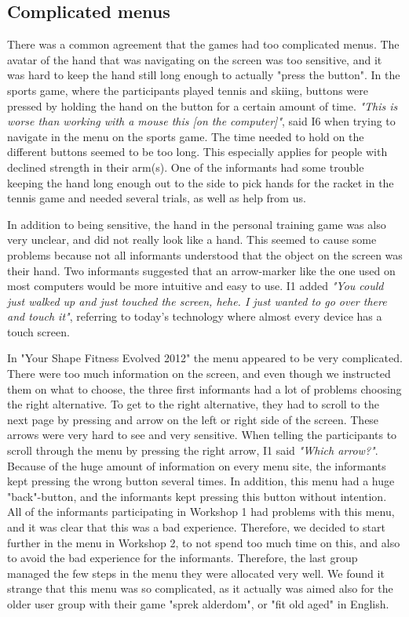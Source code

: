 \subsection{Complicated menus}
There was a common agreement that the games had too complicated menus.  The avatar of the hand that was navigating on the screen was too sensitive, and it was hard to keep the hand still long enough to actually "press the button". In the sports game, where the participants played tennis and skiing, buttons were pressed by holding the hand on the button for a certain amount of time. \emph{"This is worse than working with a mouse this [on the computer]"}, said I6 when trying to navigate in the menu on the sports game. The time needed to hold on the different buttons seemed to be too long. This especially applies for people with declined strength in their arm(s). One of the informants had some trouble keeping the hand long enough out to the side to pick hands for the racket in the tennis game and needed several trials, as well as help from us.

In addition to being sensitive, the hand in the personal training game was also very unclear, and did not really look like a hand. This seemed to cause some problems because not all informants understood that the object on the screen was their hand. Two informants suggested that an arrow-marker like the one used on most computers would be more intuitive and easy to use. I1 added \emph{"You could just walked up and just touched the screen, hehe. I just wanted to go over there and touch it"}, referring to today's technology where almost every device has a touch screen. 

In "Your Shape Fitness Evolved 2012" the menu appeared to be very complicated. There were too much information on the screen, and even though we instructed them on what to choose, the three first informants had a lot of problems choosing the right alternative. To get to the right alternative, they had to scroll to the next page by pressing and arrow on the left or right side of the screen. These arrows were very hard to see and very sensitive. When telling the participants to scroll through the menu by pressing the right arrow, I1 said \emph{"Which arrow?"}.  Because of the huge amount of information on every menu site, the informants kept pressing the wrong button several times. In addition, this menu had a huge "back"-button, and the informants kept pressing this button without intention. All of the informants participating in Workshop 1 had problems with this menu, and it was clear that this was a bad experience.  Therefore, we decided to start further in the menu in Workshop 2, to not spend too much time on this, and also to avoid the bad experience for the informants. Therefore, the last group managed the few steps in the menu they were allocated very well. We found it strange that this menu was so complicated, as it actually was aimed also for the older user group with their game "sprek alderdom", or "fit old aged" in English. 

